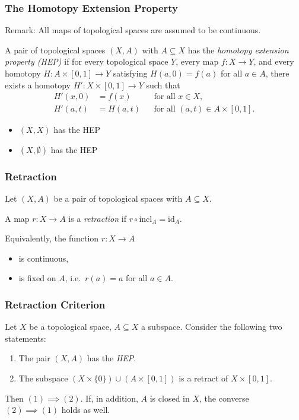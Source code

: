 \documentclass{beamer}
\begin{document}
\begin{frame}[shrink=5]
\frametitle{The Homotopy Extension Property}
Remark: All maps of topological spaces are assumed to be continuous.
\begin{definition}\label{HEP}
A pair of topological spaces $(X,A)$ with $A \subseteq X$ has the
\emph{homotopy extension property (HEP)} if for every topological space $Y$, every
map $f \colon X \to Y$, and every homotopy $H \colon A \times [0,1] \to Y$ satisfying
$H(a,0) = f(a)$ for all $a \in A$, there exists a homotopy
$H' \colon X \times [0,1] \to Y$ such that
\begin{align*}
    H'(x,0) &= f(x)    && \text{for all } x \in X, \\
    H'(a,t) &= H(a,t)  && \text{for all } (a,t) \in A \times [0,1].
\end{align*}
\end{definition}
\begin{itemize}
\item $(X,X)$ has the HEP
\item $(X, \emptyset )$ has the HEP
\end{itemize}
\end{frame}

\begin{frame}
\frametitle{Retraction}
Let $(X,A)$ be a pair of topological spaces with $A \subseteq X$.
\begin{definition}[Retraction]
A map $r \colon X \to A$ is a \emph{retraction} if $r \circ \mathrm{incl}_A = \mathrm{id}_A$.
\end{definition}
Equivalently, the function $r \colon X \to A$
\begin{itemize}
\item is continuous,
\item is fixed on $A$, i.e.\ $r(a) = a$ for all $a \in A$.
\end{itemize}
\end{frame}

\begin{frame}
\frametitle{Retraction Criterion}
\begin{lemma}
Let $X$ be a topological space, $A \subseteq X$ a subspace.
Consider the following two statements:
\begin{enumerate}
    \item The pair $(X,A)$ has the \emph{HEP}.
    \item The subspace $(X \times \{0\}) \cup (A \times [0,1])$ is a retract of $X \times [0,1]$.
\end{enumerate}
Then $(1) \implies (2)$. If, in addition, $A$ is closed in $X$, the converse
$(2) \implies (1)$ holds as well.
\end{lemma}
\end{frame}
\end{document}
